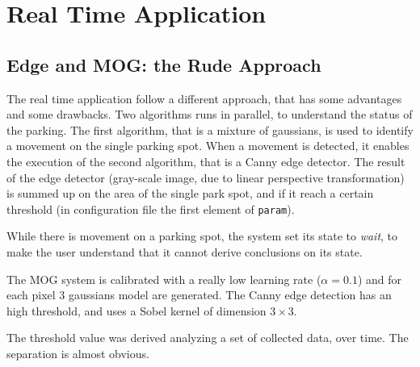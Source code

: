 
\section{Real Time Application}

	\subsection{Edge and MOG: the Rude Approach}
	
	The real time application follow a different approach, that has some advantages
	and some drawbacks. Two algorithms runs in parallel, to understand the status
	of the parking. The first algorithm, that is a mixture of gaussians, is used to
	identify a movement on the single parking spot. When a movement is detected, it
	enables the execution of the second algorithm, that is a Canny edge detector.
	The result of the edge detector (gray-scale image, due to linear perspective
	transformation) is summed up on the area of the single park spot, and if it
	reach a certain threshold (in configuration file the first element of
	\verb+param+).
	
	While there is movement on a parking spot, the system set its state to
	\emph{wait}, to make the user understand that it cannot derive conclusions on
	its state.
	
	The MOG system is calibrated with a really low learning rate ($\alpha = 0.1$)
	and for each pixel 3 gaussians model are generated. The Canny edge detection
	has an high threshold, and uses a Sobel kernel of dimension $3\times3$.
	
	The threshold value was derived analyzing a set of collected data, over time.
	The separation is almost obvious.
	
